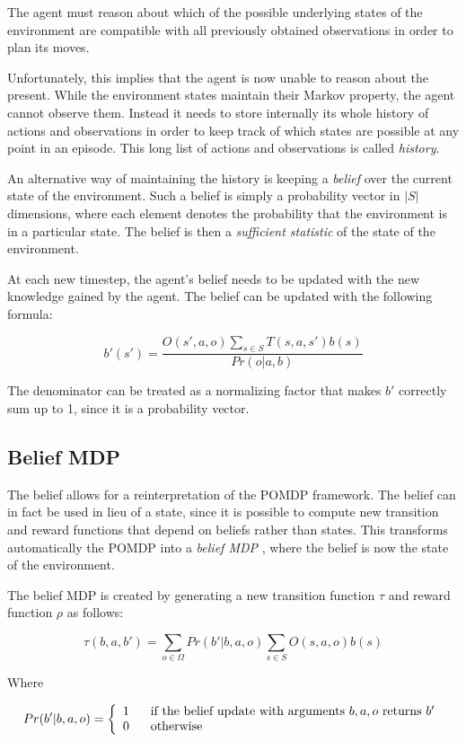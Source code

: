 The agent must reason about which of the possible underlying states of the environment are
compatible with all previously obtained observations in order to plan its moves.

Unfortunately, this implies that the agent is now unable to reason about the present. While the
environment states maintain their Markov property, the agent cannot observe them. Instead it needs
to store internally its whole history of actions and observations in order to keep track of which
states are possible at any point in an episode. This long list of actions and observations is called
\textit{history}.

An alternative way of maintaining the history is keeping a \textit{belief} over the current state of
the environment. Such a belief is simply a probability vector in $|S|$ dimensions, where each
element denotes the probability that the environment is in a particular state. The belief is then  a
\textit{sufficient statistic} of the state of the environment.

At each new timestep, the agent's belief needs to be updated with the new knowledge gained by the
agent. The belief can be updated with the following formula:

\[ b'(s') = \frac{O(s', a, o)\sum_{s\in S}T(s,a,s')b(s)}{Pr(o|a,b)} \]

The denominator can be treated as a normalizing factor that makes $b'$ correctly sum up to 1, since
it is a probability vector.

\subsection{Belief MDP}

The belief allows for a reinterpretation of the POMDP framework. The belief can in fact be used in
lieu of a state, since it is possible to compute new transition and reward functions that depend on
beliefs rather than states. This transforms automatically the POMDP into a \textit{belief MDP}
\cite{cit:pomdp}, where the belief is now the state of the environment.

The belief MDP is created by generating a new transition function $\tau$ and reward function $\rho$
as follows:

\[ \tau(b,a,b') = \sum_{o\in \Omega} Pr(b' | b, a, o) \sum_{s\in S} O(s,a,o) b(s) \]

Where

\[Pr(b' | b, a, o) = \left\{
  \begin{array}{lr}
    1 \hspace{.6cm}\text{if the belief update with arguments $b,a,o$ returns $b'$}\\
    0 \hspace{.6cm}\text{otherwise}
  \end{array}
\right.
\]

